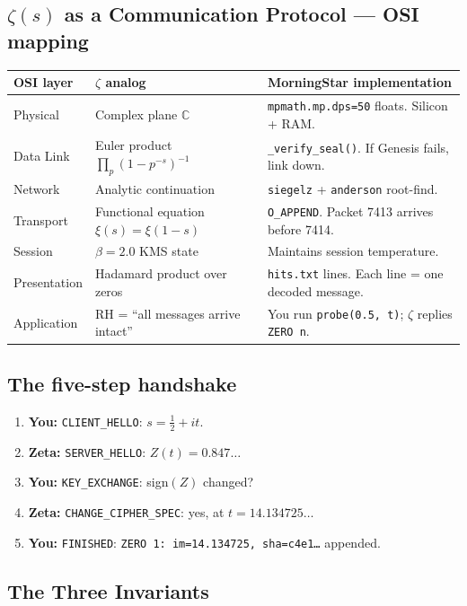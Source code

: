 \documentclass[11pt,letterpaper]{article}
\begin{document}
\subsection{$\zeta(s)$ as a Communication Protocol --- OSI mapping}

\begin{longtable}{p{2.5cm}p{4.7cm}p{6.5cm}}
\toprule
\textbf{OSI layer} & \textbf{$\zeta$ analog} & \textbf{MorningStar implementation} \\
\midrule
\endhead
Physical & Complex plane $\mathbb{C}$ & \texttt{mpmath.mp.dps=50} floats. Silicon + RAM. \\
Data Link & Euler product $\prod_p (1 - p^{-s})^{-1}$ & \texttt{\_verify\_seal()}. If Genesis fails, link down. \\
Network & Analytic continuation & \texttt{siegelz} + \texttt{anderson} root-find. \\
Transport & Functional equation $\xi(s) = \xi(1-s)$ & \texttt{O\_APPEND}. Packet 7413 arrives before 7414. \\
Session & $\beta = 2.0$ KMS state & Maintains session temperature. \\
Presentation & Hadamard product over zeros & \texttt{hits.txt} lines. Each line = one decoded message. \\
Application & RH = ``all messages arrive intact'' & You run \texttt{probe(0.5, t)}; $\zeta$ replies \texttt{ZERO n}. \\
\bottomrule
\end{longtable}

\subsection{The five-step handshake}

\begin{enumerate}
  \item \textbf{You:} \texttt{CLIENT\_HELLO}: $s = \tfrac12 + it$.
  \item \textbf{Zeta:} \texttt{SERVER\_HELLO}: $Z(t) = 0.847\ldots$
  \item \textbf{You:} \texttt{KEY\_EXCHANGE}: sign$(Z)$ changed?
  \item \textbf{Zeta:} \texttt{CHANGE\_CIPHER\_SPEC}: yes, at $t = 14.134725\ldots$
  \item \textbf{You:} \texttt{FINISHED}: \texttt{ZERO 1: im=14.134725, sha=c4e1\ldots} appended.
\end{enumerate}

\subsection{The Three Invariants}
\label{sec:invariants}
\end{document}
